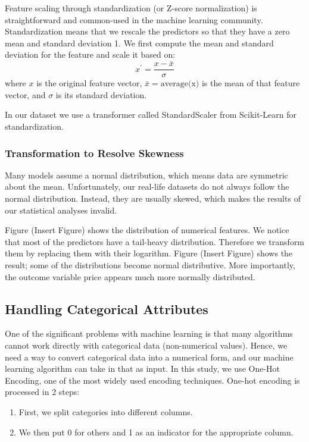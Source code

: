 Feature scaling through standardization (or Z-score normalization) is straightforward and
common-used in the machine learning community.
Standardization means that we rescale the predictors so that they have a zero
mean and standard deviation 1.  We first compute the mean and standard deviation
for the feature and scale it based on:
\[x^{'} = \frac{x - \bar{x}}{\sigma}\]
where $x$ is the original feature vector, $\bar{x} = \textrm{average(x)}$ is the mean of
that feature vector, and $\sigma$ is its standard deviation.

\noindent In our dataset we use  a transformer called StandardScaler from Scikit-Learn for
standardization.

\subsubsection{Transformation to Resolve Skewness}

Many models assume a normal distribution, which means data are symmetric about
the mean.
Unfortunately, our real-life datasets do not always follow the normal
distribution.  Instead, they are usually skewed, which makes the results of our
statistical analyses invalid.

Figure (Insert Figure) shows the distribution of numerical features. We notice
that most of the predictors have a tail-heavy distribution. Therefore we
transform them by replacing them with their logarithm. Figure (Insert Figure)
shows the result; some of the distributions become normal distributive. More
importantly, the outcome variable price appears much more normally distributed.

\subsection{Handling Categorical Attributes}

One of the significant problems with machine learning is that many algorithms
cannot work directly with categorical data (non-numerical values).  Hence, we
need a way to convert categorical data into a numerical form, and our machine
learning algorithm can take in that as input. In this study, we use  One-Hot
Encoding, one of the most widely used encoding techniques.  One-hot encoding is
processed in 2 steps:
\begin{enumerate}
    \item First, we split categories into different columns.
    \item We then put 0 for others and 1 as an indicator for the appropriate column.
\end{enumerate}

